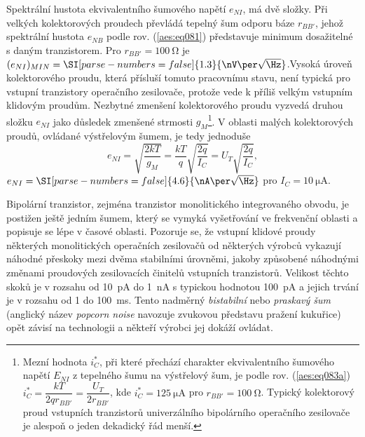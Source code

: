         Spektrální hustota ekvivalentního šumového napětí \(e_{NI}\), má dvě složky. Při velkých
        kolektorových proudech převládá tepelný šum odporu báze \(r_{BB'}\), jehož spektrální
        hustota \(e_{NB}\) podle rov. (\ref{aes:eq081}) představuje minimum dosažitelné s daným
        tranzistorem. Pro \(r_{BB'} = \SI{100}{\ohm}\) je \((e_{NI})_{MIN} = \SI[parse-numbers =
        false]{1.3}{\nV\per\sqrt{\Hz}}\).Vysoká úroveň kolektorového proudu, která přísluší tomuto
        pracovnímu stavu, není typická pro vstupní tranzistory operačního zesilovače, protože vede k
        příliš velkým vstupním klidovým proudům. Nezbytné zmenšení kolektorového proudu vyzvedá
        druhou složku \(e_{NI}\) jako důsledek zmenšené strmosti \(g_{M}\)\footnote{Mezní hodnota
        \(i^*_C\), při které přechází charakter ekvivalentního šumového napětí \(E_{NI}\) z
        tepelného šumu na výstřelový šum, je podle rov. (\ref {aes:eq083a}) \(i^*_C =
        \dfrac{kT}{2qr_{BB'}} = \dfrac{U_T}{2r_{BB'}}\), kde \(i^*_C = \SI{125}{\uA}\) pro \(r_{BB'}
        = \SI{100}{\ohm}\). Typický kolektorový proud vstupních tranzistorů univerzálního
        bipolárního operačního zesilovače je alespoň o jeden dekadický řád menší.}. V oblasti malých
        kolektorových proudů, ovládané výstřelovým šumem, je tedy jednoduše
        \begin{equation}\label{aes:eq084}
          e_{NI} = \sqrt{\dfrac{2kT}{g_M}} = \dfrac{kT}{q}\sqrt{\dfrac{2q}{I_C}} 
                = U_T\sqrt{\dfrac{2q}{I_C}},
        \end{equation} 
        \(e_{NI} = \SI[parse-numbers = false]{4.6}{\nA\per\sqrt{\Hz}}\) pro \(I_C = \SI{10}{\uA}\).

        Bipolární tranzistor, zejména tranzistor monolitického integrovaného obvodu, je postižen
        ještě jedním šumem, který se vymyká vyšetřování ve frekvenční oblasti a popisuje se lépe v
        časové oblasti. Pozoruje se, že vstupní klidové proudy některých monolitických operačních
        zesilovačů od některých výrobců vykazují náhodné přeskoky mezi dvěma stabilními úrovněmi,
        jakoby způsobené náhodnými změnami proudových zesilovacích činitelů vstupních tranzistorů.
        Velikost těchto skoků je v rozsahu od \SI{10}{\pA} do \SI{1}{\nA} s typickou hodnotou
        \SI{100}{\pA} a jejich trvání je v rozsahu od 1 do \SI{100}{\ms}. Tento nadměrný
        \emph{bistabilní} nebo \emph{praskavý šum} (anglický název \emph{popcorn noise} navozuje
        zvukovou představu pražení kukuřice) opět závisí na technologii a někteří výrobci jej dokáží
        ovládat.

